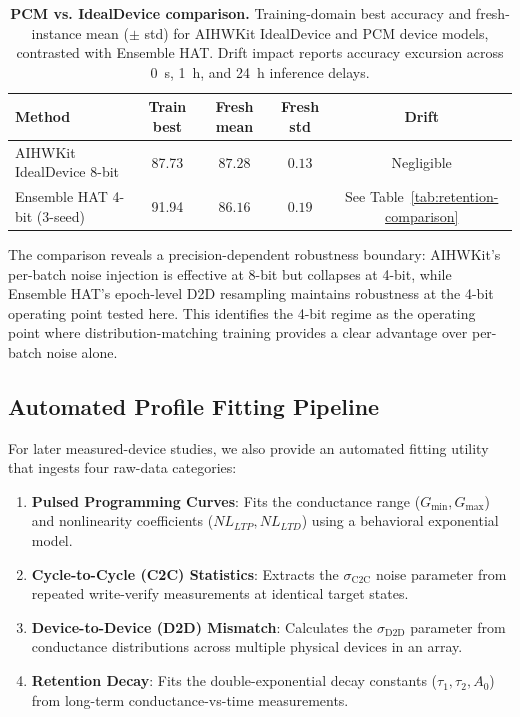 \begin{table}[ht]
\centering
\caption{\textbf{PCM vs. IdealDevice comparison.} Training-domain best accuracy and fresh-instance mean ($\pm$ std) for AIHWKit IdealDevice and PCM device models, contrasted with Ensemble HAT. Drift impact reports accuracy excursion across 0~s, 1~h, and 24~h inference delays.}
\label{tab:pcm-comparison}
\footnotesize
\setlength{\tabcolsep}{3pt}
\begin{tabular}{@{}p{}cccc@{}}
\toprule
\textbf{Method} & \textbf{Train best} & \textbf{Fresh mean} & \textbf{Fresh std} & \textbf{Drift} \\
\midrule
AIHWKit IdealDevice 8-bit~\citep{rasch2021aihwkit} & 87.73 & $87.28$ & $0.13$ & Negligible \\
Ensemble HAT 4-bit (3-seed) & 91.94 & $86.16$ & $0.19$ & See Table~\ref{tab:retention-comparison} \\
\bottomrule
\end{tabular}
\end{table}

The comparison reveals a precision-dependent robustness boundary: AIHWKit's per-batch noise injection is effective at 8-bit but collapses at 4-bit, while Ensemble HAT's epoch-level D2D resampling maintains robustness at the 4-bit operating point tested here. This identifies the 4-bit regime as the operating point where distribution-matching training provides a clear advantage over per-batch noise alone.



\subsection{Automated Profile Fitting Pipeline}

For later measured-device studies, we also provide an automated fitting utility that ingests four raw-data categories:
\begin{enumerate}
    \item \textbf{Pulsed Programming Curves}: Fits the conductance range ($G_{\min}, G_{\max}$) and nonlinearity coefficients ($NL_{LTP}, NL_{LTD}$) using a behavioral exponential model.
    \item \textbf{Cycle-to-Cycle (C2C) Statistics}: Extracts the $\sigma_{\mathrm{C2C}}$ noise parameter from repeated write-verify measurements at identical target states.
    \item \textbf{Device-to-Device (D2D) Mismatch}: Calculates the $\sigma_{\mathrm{D2D}}$ parameter from conductance distributions across multiple physical devices in an array.
    \item \textbf{Retention Decay}: Fits the double-exponential decay constants ($\tau_1, \tau_2, A_0$) from long-term conductance-vs-time measurements.
\end{enumerate}

